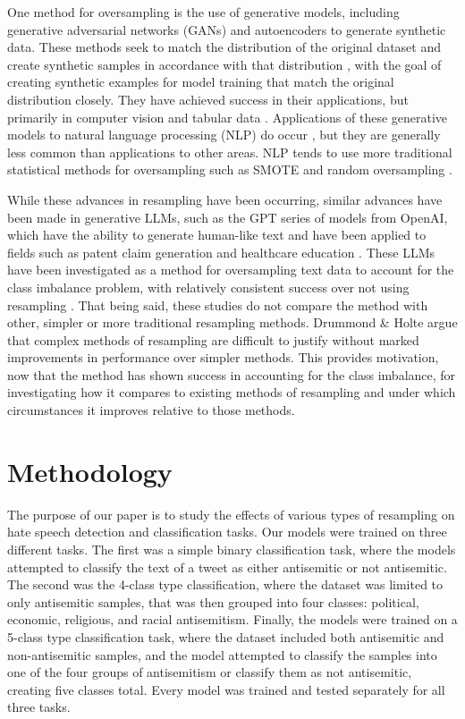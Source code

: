 \documentclass[runningheads]{llncs}
\begin{document}
One method for oversampling is the use of generative models, including generative adversarial networks (GANs) and autoencoders to generate synthetic data. These methods seek to match the distribution of the original dataset and create synthetic samples in accordance with that distribution \cite{hao}, with the goal of creating synthetic examples for model training that match the original distribution closely. They have achieved success in their applications, but primarily in computer vision and tabular data \cite{hao} \cite{engelmann} \cite{bellinger} \cite{dai}. Applications of these generative models to natural language processing (NLP) do occur \cite{phung}, but they are generally less common than applications to other areas. NLP tends to use more traditional statistical methods for oversampling such as SMOTE and random oversampling \cite{wijaya} \cite{glazkova}.

While these advances in resampling have been occurring, similar advances have been made in generative LLMs, such as the GPT series of models from OpenAI, which have the ability to generate human-like text \cite{floridi} and have been applied to fields such as patent claim generation \cite{hsiang} and healthcare education \cite{sallam}. These LLMs have been investigated as a method for oversampling text data to account for the class imbalance problem, with relatively consistent success over not using resampling \cite{edwards} \cite{usuga} \cite{shaikh}. That being said, these studies do not compare the method with other, simpler or more traditional resampling methods. Drummond \& Holte \cite{drummond} argue that complex methods of resampling are difficult to justify without marked improvements in performance over simpler methods. This provides motivation, now that the method has shown success in accounting for the class imbalance, for investigating how it compares to existing methods of resampling and under which circumstances it improves relative to those methods.

\section{Methodology}
The purpose of our paper is to study the effects of various types of resampling on hate speech detection and classification tasks. Our models were trained on three different tasks. The first was a simple binary classification task, where the models attempted to classify the text of a tweet as either antisemitic or not antisemitic. The second was the 4-class type classification, where the dataset was limited to only antisemitic samples, that was then grouped into four classes: political, economic, religious, and racial antisemitism. Finally, the models were trained on a 5-class type classification task, where the dataset included both antisemitic and non-antisemitic samples, and the model attempted to classify the samples into one of the four groups of antisemitism or classify them as not antisemitic, creating five classes total. Every model was trained and tested separately for all three tasks.
\end{document}
